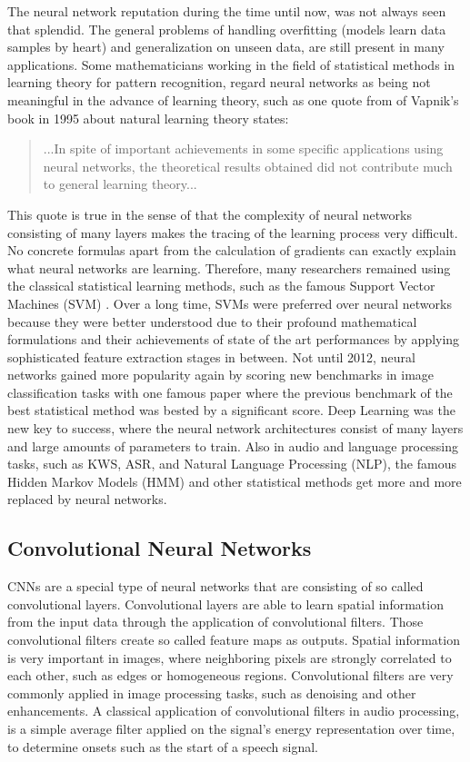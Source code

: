 The neural network reputation during the time until now, was not always seen that splendid.
The general problems of handling overfitting (models learn data samples by heart) and generalization on unseen data, are still present in many applications.
Some mathematicians working in the field of statistical methods in learning theory for pattern recognition, regard neural networks as being not meaningful in the advance of learning theory, such as one quote from \cite{Vapnik1995} of Vapnik's book in 1995 about natural learning theory states:
\begin{quote}
...In spite of important achievements in some specific applications using neural networks, the theoretical results obtained did not contribute much to general learning theory...
\end{quote}
This quote is true in the sense of that the complexity of neural networks consisting of many layers makes the tracing of the learning process very difficult.
No concrete formulas apart from the calculation of gradients can exactly explain what neural networks are learning.
Therefore, many researchers remained using the classical statistical learning methods, such as the famous Support Vector Machines (SVM) \cite{Cortes1995}.
Over a long time, SVMs were preferred over neural networks because they were better understood due to their profound mathematical formulations and their achievements of state of the art performances by applying sophisticated feature extraction stages in between.
Not until 2012, neural networks gained more popularity again by scoring new benchmarks in image classification tasks with one famous paper \cite{Krizhevsky2012} where the previous benchmark of the best statistical method was bested by a significant score.
Deep Learning was the new key to success, where the neural network architectures consist of many layers and large amounts of parameters to train.
Also in audio and language processing tasks, such as KWS, ASR, and Natural Language Processing (NLP), the famous Hidden Markov Models (HMM) and other statistical methods get more and more replaced by neural networks.



\subsection{Convolutional Neural Networks}\label{sec:prev_nn_cnn}
CNNs are a special type of neural networks that are consisting of so called convolutional layers.
Convolutional layers are able to learn spatial information from the input data through the application of convolutional filters.
Those convolutional filters create so called feature maps as outputs.
Spatial information is very important in images, where neighboring pixels are strongly correlated to each other, such as edges or homogeneous regions.
Convolutional filters are very commonly applied in image processing tasks, such as denoising and other enhancements.
A classical application of convolutional filters in audio processing, is a simple average filter applied on the signal's energy representation over time, to determine onsets such as the start of a speech signal.

